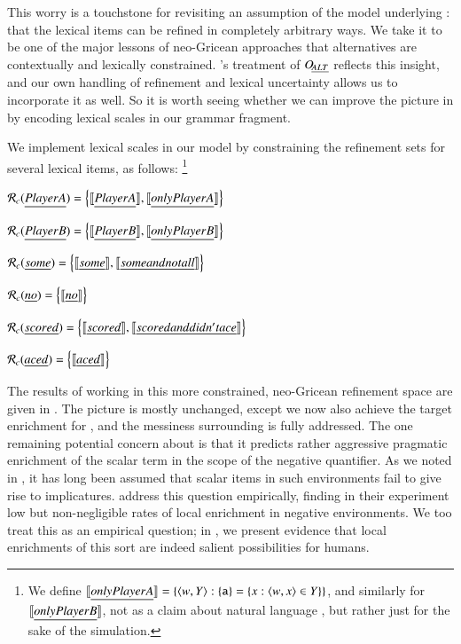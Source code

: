 \documentclass[leqno,12pt]{article}
\begin{document}
This worry is a touchstone for revisiting an assumption of the model
underlying : that the lexical items can be
refined in completely arbitrary ways. We take it to be one of the
major lessons of neo-Gricean approaches that alternatives are
contextually and lexically constrained. \CFS's treatment of $\mathop{O\negthinspace_{\emph{ALT}}}$
reflects this insight, and our own handling of refinement and lexical
uncertainty allows us to incorporate it as well. So it is worth seeing
whether we can improve the picture in  by
encoding lexical scales in our grammar fragment.

We implement lexical scales in our model by constraining the refinement sets for
several lexical items, as follows:%
\footnote{We define $\llbracket\emph{only Player A}\rrbracket = \left\{ \langle w, Y \rangle : \left\{ \texttt{a} \right\} = \left\{ x : \langle w,x \rangle \in Y \right\} \right\}$,
  and similarly for $\llbracket\emph{only Player B}\rrbracket$, not as a claim about natural language , but rather just 
  for the sake of the simulation.}
%
\begin{examples}
\item\label{neo}
  \begin{examples}
  \item $\mathcal{R}_{c}(\emph{Player A}) = \left\{ \llbracket\emph{Player A}\rrbracket, \llbracket\emph{only Player A}\rrbracket \right\}$
  \item $\mathcal{R}_{c}(\emph{Player B}) = \left\{ \llbracket\emph{Player B}\rrbracket, \llbracket\emph{only Player B}\rrbracket \right\}$
  \item $\mathcal{R}_{c}(\emph{some}) = \left\{ \llbracket\emph{some}\rrbracket, \llbracket\emph{some and not all}\rrbracket \right\}$
  \item $\mathcal{R}_{c}(\emph{no}) = \left\{ \llbracket\emph{no}\rrbracket \right\}$    
  \item $\mathcal{R}_{c}(\emph{scored}) = \left\{ \llbracket\emph{scored}\rrbracket, \llbracket\emph{scored and didn't ace}\rrbracket \right\}$
  \item $\mathcal{R}_{c}(\emph{aced}) = \left\{ \llbracket\emph{aced}\rrbracket \right\}$
  \end{examples}
\end{examples}
%
The results of working in this more constrained, neo-Gricean
refinement space are given in . The
picture is mostly unchanged, except we now also achieve the target
enrichment for , and the messiness
surrounding  is fully addressed. The one
remaining potential concern about  is
that it predicts rather aggressive pragmatic enrichment of the scalar
term in the scope of the negative quantifier. As we noted in
, it has long been assumed that scalar items
in such environments fail to give rise to
implicatures. \citet{Chemla:Spector:2011} address this question
empirically, finding in their experiment low but non-negligible rates
of local enrichment in negative environments. We too treat this as an
empirical question; in , we present evidence that
local enrichments of this sort are indeed salient possibilities for
humans.
\end{document}

